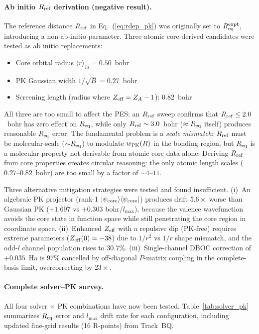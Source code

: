 \documentclass[aps,pra,twocolumn,superscriptaddress,longbibliography,floatfix]{revtex4-2}
\begin{document}
\paragraph{Ab initio $R_{\rm ref}$ derivation (negative result).}
\label{par:rref_negative}
The reference distance $R_{\rm ref}$ in Eq.~(\ref{eq:rdep_pk})
was originally set to $R_{\rm eq}^{\rm expt}$, introducing a
non-ab-initio parameter.  Three atomic core-derived candidates
were tested as ab initio replacements:
\begin{itemize}
  \item Core orbital radius $\langle r \rangle_{1s} = 0.50$~bohr
  \item PK Gaussian width $1/\sqrt{B} = 0.27$~bohr
  \item Screening length (radius where
    $Z_{\rm eff} = Z_A - 1$): 0.82~bohr
\end{itemize}
All three are too small to affect the PES: an $R_{\rm ref}$ sweep
confirms that $R_{\rm ref} \le 2.0$~bohr has zero effect on
$R_{\rm eq}$, while only $R_{\rm ref} \sim 3.0$~bohr
($\approx R_{\rm eq}$ itself) produces reasonable $R_{\rm eq}$
error.  The fundamental problem is a \emph{scale mismatch}:
$R_{\rm ref}$ must be molecular-scale (${\sim}R_{\rm eq}$) to
modulate $w_{\rm PK}(R)$ in the bonding region, but $R_{\rm eq}$
is a molecular property not derivable from atomic core data alone.
Deriving $R_{\rm ref}$ from core properties creates circular
reasoning: the only atomic length scales ($0.27$--$0.82$~bohr) are
too small by a factor of ${\sim}4$--$11$.

Three alternative mitigation strategies were tested and found
insufficient.  (i)~An algebraic PK projector (rank-1
$|\psi_{\rm core}\rangle\langle\psi_{\rm core}|$) produces
drift $5.6\times$ worse than Gaussian PK ($+1.697$ vs $+0.303$
bohr/$l_{\max}$), because the valence wavefunction avoids the
core state in function space while still penetrating the core
region in coordinate space.  (ii)~Enhanced $Z_{\rm eff}$ with a
repulsive dip (PK-free) requires extreme parameters
($Z_{\rm eff}(0) = -38$) due to $1/r^2$ vs $1/r$ shape mismatch,
and the odd-$l$ channel population rises to 30.7\%.  (iii)~Single-channel DBOC correction of $+0.035$~Ha
is 97\% cancelled by off-diagonal $P$-matrix coupling in the
complete-basis limit, overcorrecting by $23\times$.

\paragraph{Complete solver--PK survey.}
\label{par:solver_pk_survey}
All four solver $\times$ PK combinations have now been tested.
Table~\ref{tab:solver_pk} summarizes $R_{\rm eq}$ error and $l_{\max}$
drift rate for each configuration, including updated fine-grid results
(16 R-points) from Track~BQ.
\end{document}
